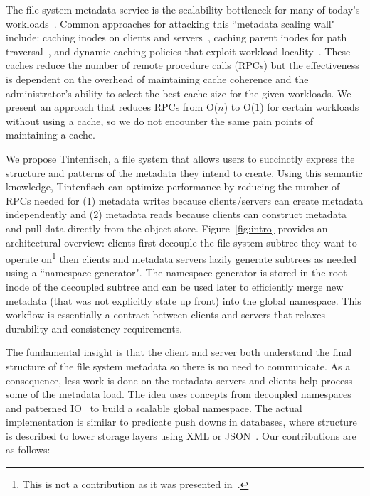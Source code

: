 The file system metadata service is the scalability bottleneck for many of today's
workloads~\cite{roselli:atec2000-FS-workloads, abad:techreport2012-fstrace,
abad:ucc2012-mimesis, alam:pdsw2011-metadata-scaling, weil:osdi2006-ceph}.
Common approaches for attacking this ``metadata scaling wall" include: caching
inodes on clients and servers~\cite{depardon:tech13-survey,
sinnamohideen:atc2010-ursa, hildebrand:msst2005-pnfs,
devulapalli:ipdps07-pvfs2, welch:fast2008-panasas}, caching parent inodes for
path traversal~\cite{patil:fast2011-giga+, ren:sc2014-indexfs,
brandt:msst2003-lh, weil:sc2004-dyn-metadata, ren:sc2014-indexfs}, and dynamic
caching policies that exploit workload locality~\cite{xing:sc2009-skyfs,
zhu:pds2008-hba, li:msst2006-dynamic}.  These caches reduce the number of
remote procedure calls (RPCs) but the effectiveness is dependent on the
overhead of maintaining cache coherence and the administrator's ability to
select the best cache size for the given workloads.  We present an approach
that reduces RPCs from O(\(n\)) to O(\(1\)) for certain workloads without using
a cache, so we do not encounter the same pain points of maintaining a cache.

We propose Tintenfisch, a file system that allows users to succinctly express
the structure and patterns of the metadata they intend to create.  Using this
semantic knowledge, Tintenfisch can optimize performance by reducing the number
of RPCs needed for (1) metadata writes because clients/servers can create
metadata independently and (2) metadata reads because clients can construct
metadata and pull data directly from the object store. Figure~\ref{fig:intro}
provides an architectural overview: clients first decouple the file system
subtree they want to operate on\footnote{This is not a contribution as it was
presented in~\cite{sevilla:ipdps18-cudele}.} then clients and metadata servers
lazily generate subtrees as needed using a ``namespace generator". The
namespace generator is stored in the root inode of the decoupled subtree and
can be used later to efficiently merge new metadata (that was not explicitly
state up front) into the global namespace. This workflow is essentially a
contract between clients and servers that relaxes durability and consistency
requirements.

The fundamental insight is that the client and server both understand the final
structure of the file system metadata so there is no need to communicate.  As a
consequence, less work is done on the metadata servers and clients help process
some of the metadata load.  The idea uses concepts from decoupled
namespaces~\cite{zheng:pdsw2014-batchfs, zheng:pdsw2015-deltafs} and patterned
IO~\cite{he:hpdc13-plfs-patterns} to build a scalable global namespace. The
actual implementation is similar to predicate push downs in databases, where
structure is described to lower storage layers using XML or
JSON~\cite{shel:pc17-pushdown}. Our contributions are as follows:

